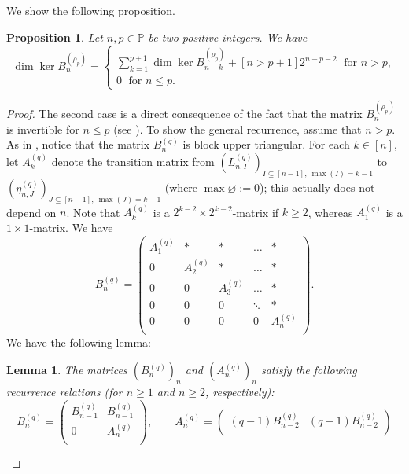 \documentclass[submission]{FPSAC2023}
\newtheorem{lem}{Lemma}
\newtheorem{proposition}{Proposition}
\newcommand{\PP}{\mathbb{P}} %
\begin{document}
We show the following proposition.
%
\begin{proposition}
\label{prop.kernel}
Let $n, p \in \PP$ be two positive integers. We have
\begin{equation*}
\dim \ker B_n^{(\rho_p)} = \begin{cases}\sum_{k =1}^{p+1} \dim \ker B_{n-k}^{(\rho_p)} + [n > p+1]2^{n-p-2}\;\mbox{ for } n > p,\\
0\;\mbox{ for } n \leq p. \end{cases}
\end{equation*}
\end{proposition}
%
\begin{proof}
The second case is a direct consequence of the fact that the matrix $B_n^{(\rho_p)}$ is invertible for $n\leq p$ (see \cite{GriVas22}).
To show the general recurrence, assume that $n>p$. As in \cite{GriVas22}, notice that
the matrix $B_n^{(q)}$ is block upper triangular. For each $k \in [n]$, let $A_k^{(q)}$ denote the transition matrix from $(L_{n, I}^{(q)})_{I \subseteq [n-1],~  \max(I) = k-1}$ to $(\eta^{(q)}_{n, J})_{J \subseteq [n-1],~\max(J) = k-1}$ (where $\max\varnothing := 0$); this actually does not depend on $n$. Note that $A_k^{(q)}$ is a $2^{k-2} \times 2^{k-2}$-matrix if $k \geq 2$, whereas $A_1^{(q)}$ is a $1 \times 1$-matrix.
We have
\begin{equation*}
B_{n}^{(q)} = 
\begin{pmatrix}
 A_1^{(q)}& *& *& \hdots& *\\
 0&A_2^{(q)}& *& \hdots& *\\
 0&0&A_3^{(q)}&\hdots& *\\
 0&0&0&\ddots&*\\
 0&0&0&0&A_n^{(q)}\\
 \end{pmatrix}.
\end{equation*}
We have the following lemma:
\begin{lem}
\label{lem : rec}
The matrices $\left(B_n^{(q)}\right)_n$ and $\left (A_n^{(q)}\right)_n$ satisfy the following recurrence relations (for $n \geq 1$ and $n \geq 2$, respectively):
\begin{equation*}
B_{n}^{(q)} = 
\begin{pmatrix}
 B_{n-1}^{(q)}&B_{n-1}^{(q)}\\
0 &A_n^{(q)}\\
 \end{pmatrix},
 \qquad
A_{n}^{(q)} = 
\begin{pmatrix}
 (q-1)B_{n-2}^{(q)}& (q-1)B_{n-2}^{(q)}\\

\end{pmatrix}
\end{equation*}
\end{lem}
\end{proof}
\end{document}
